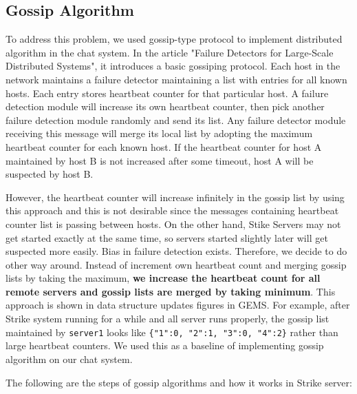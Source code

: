 \documentclass[dareport.tex]{subfiles}
\begin{document}
\subsection{Gossip Algorithm}

To address this problem, we used gossip-type protocol to implement distributed algorithm in the chat system. In the article "Failure Detectors for Large-Scale Distributed Systems"\cite{failuredetector}, it introduces a basic gossiping protocol. Each host in the network maintains a failure detector maintaining a list with entries for all known hosts. Each entry stores heartbeat counter for that particular host. A failure detection module will increase its own heartbeat counter, then pick another failure detection module randomly and send its list. Any failure detector module receiving this message will merge its local list by adopting the maximum heartbeat counter for each known host. If the heartbeat counter for host A  maintained by host B is not increased after some timeout, host A will be suspected by host B. 

However, the heartbeat counter will increase infinitely in the gossip list by using this approach and this is not desirable since the messages containing heartbeat counter list is passing between hosts. On the other hand, Stike Servers may not get started exactly at the same time, so servers started slightly later will get suspected more easily. Bias in failure detection exists. Therefore, we decide to do other way around. Instead of increment own heartbeat count and merging gossip lists by taking the maximum, \textbf{we increase the heartbeat count for all remote servers and gossip lists are merged by taking minimum}. This approach is shown in data structure updates figures in GEMS\cite{gems}. For example, after Strike system running for a while and all server runs properly, the gossip list maintained by \verb|server1| looks like \verb|{"1":0, "2":1, "3":0, "4":2}| rather than large heartbeat counters. We used this as a baseline of implementing gossip algorithm on our chat system. 

The following are the steps of gossip algorithms and how it works in Strike server:
\end{document}
